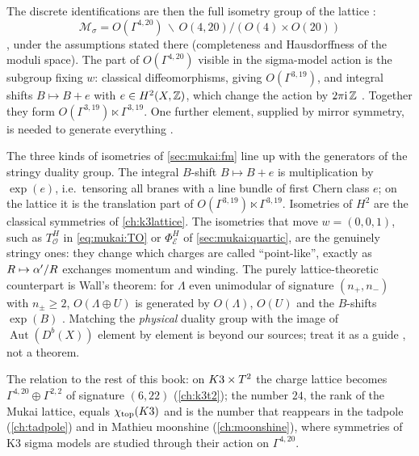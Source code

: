 The discrete identifications are then the full isometry group of the lattice
:
\begin{equation}\label{eq:mukai:modulispace}
  \mathcal M_\sigma=O(\Gamma^{4,20})\,\backslash\, O(4,20)/(O(4)\times O(20))
\end{equation}
 \TL, under the assumptions stated there
(completeness and Hausdorffness of the moduli space). The part of $O(\Gamma^{4,20})$ visible in
the sigma-model action is the subgroup fixing $w$: classical diffeomorphisms, giving
$O(\Gamma^{3,19})$, and integral shifts $B\mapsto B+e$ with $e\in H^2(X,\mathbb{Z})$, which change the
action by $2\pi\mathrm{i}\,\mathbb{Z}$ . Together they form
$O(\Gamma^{3,19})\ltimes\Gamma^{3,19}$. One further element, supplied by mirror symmetry, is
needed to generate everything .

\begin{physicsbox}
The three kinds of isometries of \cref{sec:mukai:fm} line up with the generators of the stringy
duality group. The integral $B$-shift $B\mapsto B+e$ is multiplication by $\exp(e)$, i.e.\
tensoring all branes with a line bundle of first Chern class $e$; on the lattice it is the
translation part of $O(\Gamma^{3,19})\ltimes\Gamma^{3,19}$. Isometries of $H^2$ are the classical
symmetries of \cref{ch:k3lattice}. The isometries that move $w=(0,0,1)$, such as
$T^H_{\mathcal O}$ in \eqref{eq:mukai:TO} or $\Phi^H_{\mathcal E}$ of
\cref{sec:mukai:quartic}, are the genuinely stringy ones: they change which charges are called
``point-like'', exactly as $R\mapsto\alpha'/R$ exchanges momentum and winding. The purely
lattice-theoretic counterpart is Wall's theorem: for $\Lambda$ even unimodular of signature
$(n_+,n_-)$ with $n_\pm\ge2$, $O(\Lambda\oplus U)$ is generated by $O(\Lambda)$, $O(U)$ and the
$B$-shifts $\exp(B)$ \source{Huy ch.~14, Prop.~2.9, ll.~13282--13285}. Matching the
\emph{physical} duality group with the image of $\operatorname{Aut}(D^b(X))$ element by element
is beyond our sources; treat it as a guide \TC, not a theorem.
\end{physicsbox}

The relation to the rest of this book: on $K3\times T^2$ the charge lattice becomes
$\Gamma^{4,20}\oplus\Gamma^{2,2}$ of signature $(6,22)$ (\cref{ch:k3t2}); the number $24$, the
rank of the Mukai lattice, equals $\chi_{\rm top}(K3)$ and is the number that reappears in the
tadpole (\cref{ch:tadpole}) and in Mathieu moonshine (\cref{ch:moonshine}), where symmetries of
K3 sigma models are studied through their action on $\Gamma^{4,20}$.

